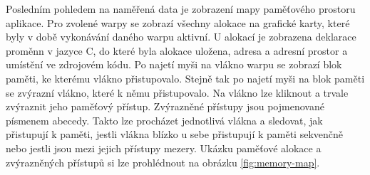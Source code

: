 Posledním pohledem na naměřená data je zobrazení mapy paměťového prostoru aplikace. Pro zvolené warpy se zobrazí všechny alokace na grafické karty, které byly v době vykonávání daného warpu aktivní. U alokací je zobrazena deklarace proměnn v jazyce C, do které byla alokace uložena, adresa a adresní prostor a umístění ve zdrojovém kódu. Po najetí myši na vlákno warpu se zobrazí blok paměti, ke kterému vlákno přistupovalo. Stejně tak po najetí myši na blok paměti se zvýrazní vlákno, které k němu přistupovalo. Na vlákno lze kliknout a trvale zvýraznit jeho paměťový přístup. Zvýrazněné přístupy jsou pojmenované písmenem abecedy. Takto lze procházet jednotlivá vlákna a sledovat, jak přistupují k paměti, jestli vlákna blízko u sebe přistupují k paměti sekvenčně nebo jestli jsou mezi jejich přístupy mezery. Ukázku paměťové alokace a zvýrazněných přístupů si lze prohlédnout na obrázku \ref{fig:memory-map}. 


